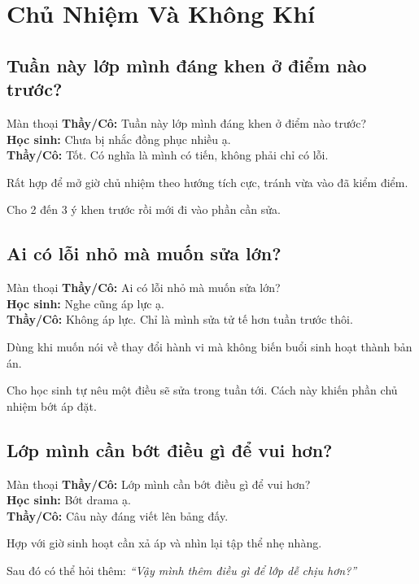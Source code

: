 \chapter{Chủ Nhiệm Và Không Khí}

\section{Tuần này lớp mình đáng khen ở điểm nào trước?}
\begin{manthoai}{Màn thoại}
\textbf{Thầy/Cô:} Tuần này lớp mình đáng khen ở điểm nào trước?\\
\textbf{Học sinh:} Chưa bị nhắc đồng phục nhiều ạ.\\
\textbf{Thầy/Cô:} Tốt. Có nghĩa là mình có tiến, không phải chỉ có lỗi.
\end{manthoai}
\begin{dungkhinào}
Rất hợp để mở giờ chủ nhiệm theo hướng tích cực, tránh vừa vào đã kiểm điểm.
\end{dungkhinào}
\begin{nhipthem}
Cho 2 đến 3 ý khen trước rồi mới đi vào phần cần sửa.
\end{nhipthem}
\ngancach

\section{Ai có lỗi nhỏ mà muốn sửa lớn?}
\begin{manthoai}{Màn thoại}
\textbf{Thầy/Cô:} Ai có lỗi nhỏ mà muốn sửa lớn?\\
\textbf{Học sinh:} Nghe cũng áp lực ạ.\\
\textbf{Thầy/Cô:} Không áp lực. Chỉ là mình sửa tử tế hơn tuần trước thôi.
\end{manthoai}
\begin{dungkhinào}
Dùng khi muốn nói về thay đổi hành vi mà không biến buổi sinh hoạt thành bản án.
\end{dungkhinào}
\begin{nhipthem}
Cho học sinh tự nêu một điều sẽ sửa trong tuần tới. Cách này khiến phần chủ nhiệm bớt áp đặt.
\end{nhipthem}
\ngancach

\section{Lớp mình cần bớt điều gì để vui hơn?}
\begin{manthoai}{Màn thoại}
\textbf{Thầy/Cô:} Lớp mình cần bớt điều gì để vui hơn?\\
\textbf{Học sinh:} Bớt drama ạ.\\
\textbf{Thầy/Cô:} Câu này đáng viết lên bảng đấy.
\end{manthoai}
\begin{dungkhinào}
Hợp với giờ sinh hoạt cần xả áp và nhìn lại tập thể nhẹ nhàng.
\end{dungkhinào}
\begin{nhipthem}
Sau đó có thể hỏi thêm: \textit{``Vậy mình thêm điều gì để lớp dễ chịu hơn?''}
\end{nhipthem}
\ngancach

